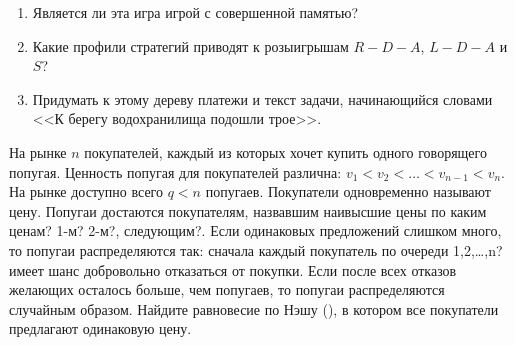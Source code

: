 \begin{problem}
{}
\begin{enumerate}
\item Является ли эта игра игрой с совершенной памятью?\par
\item Какие профили стратегий приводят к розыигрышам  $R-D-A$,  $L-D-A$  и  $S$? \par
\item  Придумать к этому дереву платежи и текст задачи, начинающийся словами <<К берегу водохранилища подошли трое>>.
\end{enumerate}


\begin{sol}

\end{sol}
\end{problem}



\begin{problem}
\begin{source} \cite{colell:mt} \end{source}
На рынке  $n$  покупателей, каждый из которых хочет купить одного говорящего попугая. Ценность попугая для покупателей различна:  $v_{1} <v_{2} <\ldots <v_{n-1} <v_{n} $. На рынке доступно всего  $q<n$  попугаев. Покупатели одновременно называют цену. Попугаи достаются покупателям, назвавшим наивысшие цены {\red по каким ценам? 1-м? 2-м?, следующим?}. Если одинаковых предложений слишком много, то попугаи распределяются так: сначала каждый покупатель {\red по очереди 1,2,\ldots,n?} имеет шанс добровольно отказаться от покупки. Если после всех отказов желающих осталось больше, чем попугаев, то попугаи распределяются случайным образом.
Найдите равновесие по Нэшу (), в котором все покупатели предлагают одинаковую цену.\par



\begin{sol}

\end{sol}
\end{problem}



